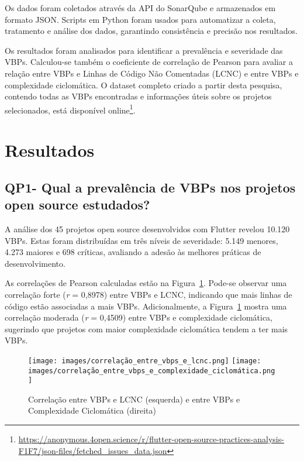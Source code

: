 \documentclass[12pt]{article}
\begin{document}
Os dados foram coletados através da API do SonarQube e armazenados em formato JSON. Scripts em Python foram usados para automatizar a coleta, tratamento e análise dos dados, garantindo consistência e precisão nos resultados. 

Os resultados foram analisados para identificar a prevalência e severidade das VBPs. Calculou-se também o coeficiente de correlação de Pearson para avaliar a relação entre VBPs e Linhas de Código Não Comentadas (LCNC) e entre VBPs e complexidade ciclomática. O dataset completo criado a partir desta pesquisa, contendo todas as VBPs encontradas e informações úteis sobre os projetos selecionados, está disponível online\footnote{\url{https://anonymous.4open.science/r/flutter-open-source-practices-analysis-F1F7/json-files/fetched_issues_data.json}}.

\section{Resultados}
\subsection{QP1- Qual a prevalência de VBPs nos projetos open source estudados?}
A análise dos 45 projetos open source desenvolvidos com Flutter revelou 10.120 VBPs. Estas foram distribuídas em três níveis de severidade: 5.149 menores, 4.273 maiores e 698 críticas, avaliando a adesão às melhores práticas de desenvolvimento.

As correlações de Pearson calculadas estão na Figura~\ref{fig:vbps_vs_lcnc_and_vbps_vs_complexity}. Pode-se observar uma correlação forte (\textit{r} = 0,8978) entre VBPs e LCNC, indicando que mais linhas de código estão associadas a mais VBPs. Adicionalmente, a Figura~\ref{fig:vbps_vs_lcnc_and_vbps_vs_complexity} mostra uma correlação moderada (\textit{r} = 0,4509) entre VBPs e complexidade ciclomática, sugerindo que projetos com maior complexidade ciclomática tendem a ter mais VBPs.

\begin{figure}[H]
\centering
\texttt{[image: images/correlação\_entre\_vbps\_e\_lcnc.png]}
\texttt{[image: images/correlação\_entre\_vbps\_e\_complexidade\_ciclomática.png]}
\caption{Correlação entre VBPs e LCNC (esquerda) e entre VBPs e Complexidade Ciclomática (direita)}
\label{fig:vbps_vs_lcnc_and_vbps_vs_complexity}
\end{figure}
\end{document}
